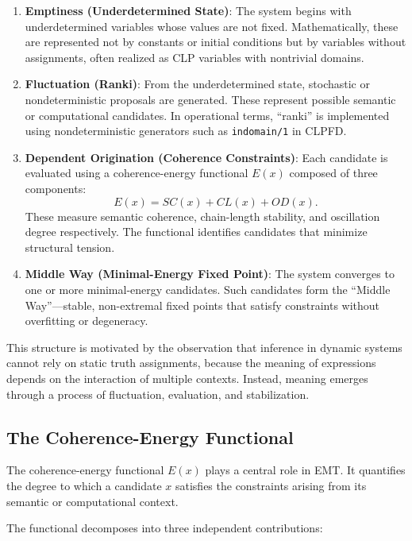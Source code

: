 \documentclass[11pt]{article}
\theoremstyle{definition}
\theoremstyle{remark}
\begin{document}
\begin{enumerate}
    \item \textbf{Emptiness (Underdetermined State)}:
    The system begins with underdetermined variables whose values
    are not fixed. Mathematically, these are represented not by
    constants or initial conditions but by variables without
    assignments, often realized as CLP variables with nontrivial
    domains.

    \item \textbf{Fluctuation (Ranki)}:
    From the underdetermined state, stochastic or nondeterministic
    proposals are generated. These represent possible semantic or
    computational candidates. In operational terms, ``ranki'' is
    implemented using nondeterministic generators such as
    \texttt{indomain/1} in CLPFD.

    \item \textbf{Dependent Origination (Coherence Constraints)}:
    Each candidate is evaluated using a coherence-energy functional
    $E(x)$ composed of three components:
    \[
        E(x) = SC(x) + CL(x) + OD(x).
    \]
    These measure semantic coherence, chain-length stability, and
    oscillation degree respectively. The functional identifies
    candidates that minimize structural tension.

    \item \textbf{Middle Way (Minimal-Energy Fixed Point)}:
    The system converges to one or more minimal-energy candidates.
    Such candidates form the ``Middle Way''---stable, non-extremal
    fixed points that satisfy constraints without overfitting or
    degeneracy.
\end{enumerate}

This structure is motivated by the observation that inference in
dynamic systems cannot rely on static truth assignments, because
the meaning of expressions depends on the interaction of multiple
contexts. Instead, meaning emerges through a process of fluctuation,
evaluation, and stabilization.

\subsection{The Coherence-Energy Functional}

The coherence-energy functional $E(x)$ plays a central role in EMT.
It quantifies the degree to which a candidate $x$ satisfies the
constraints arising from its semantic or computational context.

The functional decomposes into three independent contributions:
\end{document}
